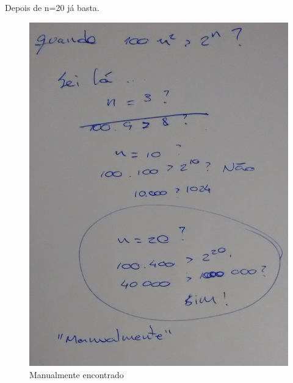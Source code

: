 \documentclass{article}
\begin{document}
Depois de n=20 já basta.

\begin{figure}[h!]
\centering
\includegraphics[scale=0.15]{ex_03.jpg}
\caption{Manualmente encontrado}
\label{fig:univerise}
\end{figure}
\end{document}
